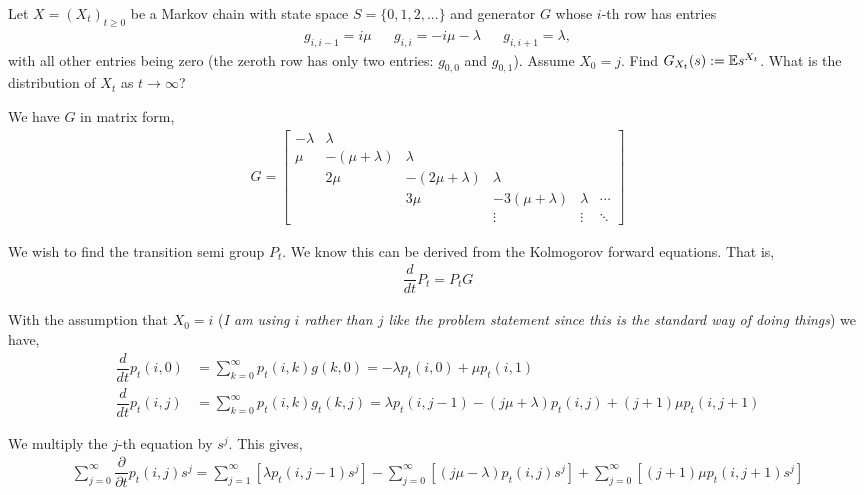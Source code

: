\documentclass[10pt]{article}
\begin{document}
\begin{problem}[Exercise 5.3]
    Let \( X=(X_t)_{t\geq 0} \) be a Markov chain with state space \( S=\{0,1,2,...\} \) and generator \( G \) whose \( i \)-th row has entries
    \begin{align*}
        g_{i,i-1} = i\mu && g_{i,i} = -i\mu-\lambda && g_{i,i+1} = \lambda,
    \end{align*}
    with all other entries being zero (the zeroth row has only two entries: \( g_{0,0} \) and \( g_{0,1} \)). Assume \( X_0=j \). Find \( G_{X_t}(s) := \mathbb{E} s^{X_t} \). What is the distribution of \( X_t \) as \( t\to\infty \)?
\end{problem}

\begin{solution}[Solution]
We have \( G \) in matrix form,
\begin{align*}
    G = 
    \left[\begin{array}{cccccc}
        -\lambda & \lambda \\
        \mu & -(\mu+\lambda) & \lambda \\
        & 2\mu & -(2\mu+\lambda) & \lambda \\
        & & 3\mu & -3(\mu+\lambda) & \lambda & \cdots \\
        & & & \vdots & \vdots & \ddots
    \end{array}\right]
\end{align*}

We wish to find the transition semi group \( P_t \). We know this can be derived from the Kolmogorov forward equations. That is,
\begin{align*}
    \dfrac{d}{dt}P_t = P_t G
\end{align*}

With the assumption that \( X_0 = i \) ({\em I am using \( i \) rather than \( j \) like the problem statement since this is the standard way of doing things}) we have,
\begin{align*}
    \dfrac{d}{dt}p_t(i,0) &= \sum_{k=0}^{\infty}p_t(i,k)g(k,0) %
    = -\lambda p_t(i,0) + \mu p_t(i,1) \\
    \dfrac{d}{dt}p_t(i,j) &= \sum_{k=0}^{\infty}p_t(i,k)g_t(k,j) 
    = \lambda p_t(i,j-1) -(j\mu+\lambda) p_t(i,j) + (j+1)\mu p_t(i,j+1) \tag*{\( j\geq 1 \)}
\end{align*}

We multiply the \( j \)-th equation by \( s^j \).
This gives,
\begin{align*}
    \sum_{j=0}^{\infty} \dfrac{\partial}{\partial t} p_t(i,j)s^j
    = \sum_{j=1}^{\infty} \left[ \lambda p_t(i,j-1)s^j\right] - \sum_{j=0}^{\infty}\left[ (j\mu-\lambda)p_t(i,j)s^j\right] + \sum_{j=0}^{\infty} \left[ (j+1)\mu p_t(i,j+1)s^j \right]
\end{align*}


\end{solution}
\end{document}
